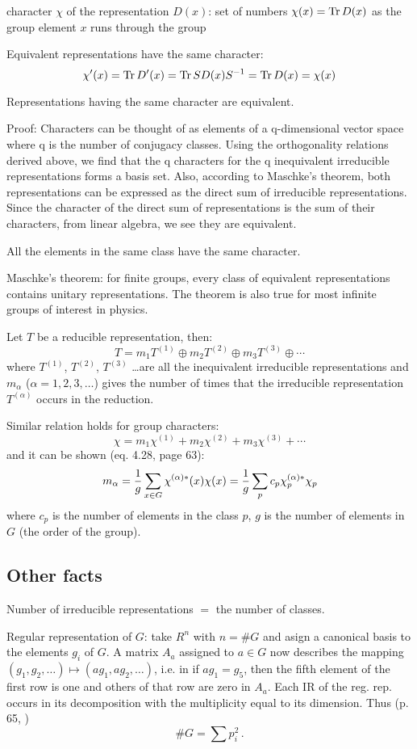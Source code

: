 character $\chi$ of the representation $D(x)$: set of numbers $\chi(x)=\hbox{Tr}\,
D(x)$ as the group element $x$ runs through the group 

Equivalent representations have the same character:
$$\chi'(x)=\hbox{Tr}\, D'(x)=\hbox{Tr}\, SD(x)S^{-1}=\hbox{Tr}\, D(x)=\chi(x)$$

Representations having the same character are equivalent.

Proof: Characters can be thought of as elements of a q-dimensional vector space
where q is the number of conjugacy classes. Using the orthogonality relations
derived above, we find that the q characters for the q inequivalent irreducible
representations forms a basis set. Also, according to Maschke's theorem, both
representations can be expressed as the direct sum of irreducible
representations. Since the character of the direct sum of representations is
the sum of their characters, from linear algebra, we see they are equivalent.

All the elements in the same class have the same character.

Maschke's theorem: for finite groups, every class of equivalent representations
contains unitary representations. The theorem is also true for most infinite
groups of interest in physics.

Let $T$ be a reducible representation, then:
$$T=m_1T^{(1)} \oplus m_2T^{(2)} \oplus m_3T^{(3)}\oplus \cdots$$
where $T^{(1)}$, $T^{(2)}$, $T^{(3)}$ \dots are 
all the inequivalent irreducible
representations and $m_\alpha$ ($\alpha=1,2,3,\dots$) gives the number of
times that the irreducible representation $T^{(\alpha)}$ occurs in the
reduction.

Similar relation holds for group characters:
$$\chi=m_1\chi^{(1)} + m_2\chi^{(2)} + m_3\chi^{(3)} + \cdots$$
and it can be shown \cite{elliott} (eq. 4.28, page 63):
$$m_\alpha={1\over g}\sum_{x\in G} \chi^{(\alpha)*}(x)\chi(x)=
{1\over g}\sum_{p} c_p\chi^{(\alpha)*}_p\chi_p$$
where $c_p$ is the number of elements in the class $p$, $g$ is the number of
elements in $G$ (the order of the group).


\subsection{Other facts}

Number of irreducible representations $=$ the number of classes.

{\tenit Regular representation} of $G$: 
take $R^n$ with $n=\# G$ and asign a canonical
basis to the elements $g_i$ of $G$. A matrix $A_a$ assigned to $a\in G$ now
describes the mapping $(g_1,g_2,\ldots)\mapsto (ag_1,ag_2,\ldots)$, i.e. in if
$ag_1=g_5$, then the fifth element of the first row is one and others of that
row are zero in $A_a$. Each IR of the reg. rep. occurs in its decomposition
with the multiplicity equal to its dimension. Thus (p. 65, \cite{sternberg})
%
$$
  \# G = \sum p_i^2\,.
$$
%

